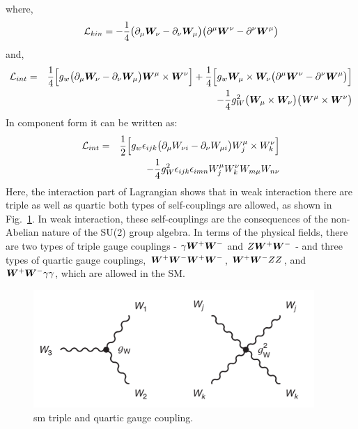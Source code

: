 where,
\begin{equation}
    \mathcal{L}_{kin} = -\frac{1}{4} \big( \partial_{\mu} \boldsymbol{W}_{\nu} - \partial_{\nu} \boldsymbol{W}_{\mu} \big) \big( \partial^{\mu} \boldsymbol{W}^{\nu} - \partial^{\nu} \boldsymbol{W}^{\mu} \big) \nonumber
\end{equation}
and,
\begin{eqnarray}
    \mathcal{L}_{int} & = &  \frac{1}{4} \Big[  g_w\big( \partial_{\mu} \boldsymbol{W}_{\nu} - \partial_{\nu} \boldsymbol{W}_{\mu} \big)\boldsymbol{W}^{\mu} \times \boldsymbol{W}^{\nu} \Big] + \frac{1}{4} \Big[  g_w \boldsymbol{W}_{\mu} \times \boldsymbol{W}_{\nu}  \big( \partial^{\mu} \boldsymbol{W}^{\nu} - \partial^{\nu} \boldsymbol{W}^{\mu} \big)\Big] \nonumber \\
        &   & - \frac{1}{4} g_W^2 \big(\boldsymbol{W}_{\mu} \times \boldsymbol{W}_{\nu}\big) \big(\boldsymbol{W}^{\mu} \times \boldsymbol{W}^{\nu}\big) 
\end{eqnarray}
In component form it can be written as:
\begin{eqnarray}
    \mathcal{L}_{int} & = & \frac{1}{2} \Big[  g_w \epsilon_{ijk}\big( \partial_{\mu} W_{\nu i} - \partial_{\nu} W_{\mu i} \big)W^{\mu}_j \times W^{\nu}_k \Big] \nonumber \\
        &   & - \frac{1}{4} g_W^2 \epsilon_{ijk} \epsilon_{imn} W^{\mu}_j W^{\nu}_k W_{m \mu} W_{n \nu}
\end{eqnarray}
Here, the interaction part of Lagrangian shows that in weak interaction there are triple as well as quartic both types of self-couplings are allowed, as shown in Fig.~\ref{fig:sm_triple_quartic}. In weak interaction, these self-couplings are the consequences of the non-Abelian nature of the SU(2) group algebra. In terms of the physical fields, there are two types of triple gauge couplings - $\gamma \boldsymbol{W}^+\boldsymbol{W}^-$ and $Z \boldsymbol{W}^+\boldsymbol{W}^-$ - and three types of quartic gauge couplings, $\boldsymbol{W}^+\boldsymbol{W}^- \boldsymbol{W}^+\boldsymbol{W}^-$, $\boldsymbol{W}^+\boldsymbol{W}^- ZZ$, and $\boldsymbol{W}^+\boldsymbol{W}^- \gamma \gamma$, which are allowed in the SM.
\begin{figure}[htbp]
    \centering
    \includegraphics[width=0.95\textwidth]{Pictures/sm-triple-quarticgc.png}
    \caption{sm triple and quartic gauge coupling.}
    \label{fig:sm_triple_quartic}
\end{figure}


